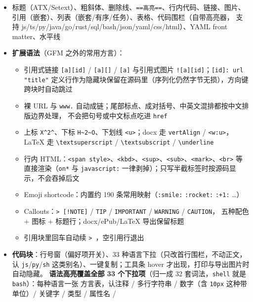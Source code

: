 \documentclass[11pt,a4paper]{ctexart}
\begin{document}
\begin{itemize}
\item 标题（ATX/Setext）、粗斜体、删除线、\texttt{==高亮==}、行内代码、链接、图片、
引用（嵌套）、列表（嵌套/有序/任务）、表格、代码围栏（自带高亮器，
支持 js/ts/py/java/go/rust/sql/bash/json/yaml/css/html）、YAML front matter、水平线
\item \textbf{扩展语法}（GFM 之外的常用方言）：
\begin{itemize}
\item 引用式链接 \texttt{[a][id]} / \texttt{[a][]} / \texttt{[a]} 与引用式图片 \texttt{![a][id]}；\texttt{[id]: url "title"}
定义行作为隐藏块保留在源码里（序列化仍然字节无损），方向键跨块时自动跳过
\item 裸 URL 与 \texttt{www.} 自动成链；尾部标点、成对括号、中英文混排都按中文排版边界处理，
不会把句号或中文标点吃进 \texttt{href}
\item 上标 \texttt{X\textasciicircum{}2\textasciicircum{}}、下标 \texttt{H\textasciitilde{}2\textasciitilde{}O}、下划线 \texttt{\textless{}u\textgreater{}}；docx 走 \texttt{vertAlign} / \texttt{\textless{}w:u\textgreater{}}，
LaTeX 走 \texttt{\textbackslash{}textsuperscript} / \texttt{\textbackslash{}textsubscript} / \texttt{\textbackslash{}underline}
\item 行内 HTML：\texttt{\textless{}span style\textgreater{}}、\texttt{\textless{}kbd\textgreater{}}、\texttt{\textless{}sup\textgreater{}}、\texttt{\textless{}sub\textgreater{}}、\texttt{\textless{}mark\textgreater{}}、\texttt{\textless{}br\textgreater{}} 等
直接渲染（\texttt{on*} 与 \texttt{javascript:} 一律剥掉）；只写半截标签时按源码显示，不会吞掉后文
\item Emoji shortcode：内置约 190 条常用映射（\texttt{:smile:} \texttt{:rocket:} \texttt{:+1:} …）
\item Callouts：\texttt{\textgreater{} [!NOTE]} / \texttt{TIP} / \texttt{IMPORTANT} / \texttt{WARNING} / \texttt{CAUTION}，
五种配色 + 图标 + 标题行；docx/ePub/LaTeX 导出保留标题
\item 引用块里回车自动续 \texttt{\textgreater{} }，空引用行退出
\end{itemize}
\item \textbf{代码块}：行号窗（偏好项开关）、33 种语言下拉（只改首行围栏，不动正文，
认 \texttt{js}/\texttt{py}/\texttt{sh} 这类别名）、一键复制；工具条 hover 才出现，打印与导出图片时自动隐藏。
\textbf{语法高亮覆盖全部 33 个下拉项}（归一成 32 套词法，\texttt{shell} 就是 \texttt{bash}）：每种语言一张
方言表，认注释 / 多行字符串 / 数字（含 \texttt{10px} 这种带单位）/ 关键字 / 类型 / 属性名 /

\end{itemize}
\end{document}
